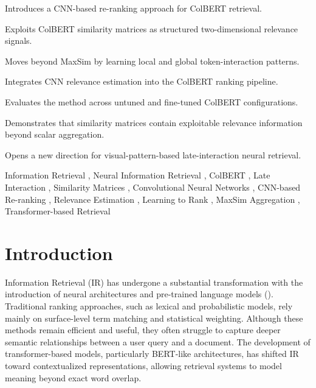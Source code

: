 \documentclass[preprint,5p,times,twocolumn,authoryear]{elsarticle}
\begin{document}
\begin{frontmatter}
\begin{highlights}
\item Introduces a CNN-based re-ranking approach for ColBERT retrieval.
\item Exploits ColBERT similarity matrices as structured two-dimensional relevance signals.
\item Moves beyond MaxSim by learning local and global token-interaction patterns.
\item Integrates CNN relevance estimation into the ColBERT ranking pipeline.
\item Evaluates the method across untuned and fine-tuned ColBERT configurations.
\item Demonstrates that similarity matrices contain exploitable relevance information beyond scalar aggregation.
\item Opens a new direction for visual-pattern-based late-interaction neural retrieval.
\end{highlights}

\begin{keyword}

Information Retrieval \sep
Neural Information Retrieval \sep
ColBERT \sep
Late Interaction \sep
Similarity Matrices \sep
Convolutional Neural Networks \sep
CNN-based Re-ranking \sep
Relevance Estimation \sep
Learning to Rank \sep
MaxSim Aggregation \sep
Transformer-based Retrieval
\end{keyword}

\end{frontmatter}



\section{Introduction}
\label{intro}

Information Retrieval (IR) has undergone a substantial transformation with the introduction of neural architectures and pre-trained language models (\cite{attention, bert,colbert,pretrained}). Traditional ranking approaches, such as lexical and probabilistic models, rely mainly on surface-level term matching and statistical weighting. Although these methods remain efficient and useful, they often struggle to capture deeper semantic relationships between a user query and a document. The development of transformer-based models, particularly BERT-like architectures, has shifted IR toward contextualized representations, allowing retrieval systems to model meaning beyond exact word overlap.
\end{document}
